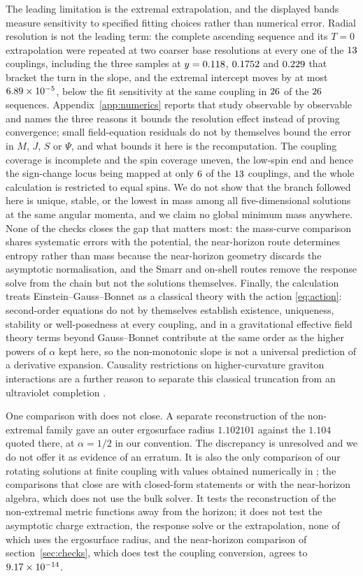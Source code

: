 \documentclass[11pt,a4paper]{article}
\begin{document}
The leading limitation is the extremal extrapolation, and the displayed bands
measure sensitivity to specified fitting choices rather than numerical error.
Radial resolution is not the leading term: the complete ascending sequence and
its $T=0$ extrapolation were repeated at two coarser base resolutions at every
one of the $13$ couplings, including the three samples at
$y=0.118$, $0.1752$ and $0.229$ that bracket the turn in the
slope, and the extremal intercept moves by at most $6.89\times 10^{-5}$, below the
fit sensitivity at the same coupling in $26$ of the $26$
sequences. Appendix~\ref{app:numerics} reports that study observable by
observable and names the three reasons it bounds the resolution effect instead
of proving convergence; small field-equation residuals do not by themselves
bound the error in $M$, $J$, $S$ or $\Psi$, and what bounds it here is the
recomputation. The coupling coverage is incomplete and the spin coverage
uneven, the low-spin end and hence the sign-change locus being mapped at only
$6$ of the $13$ couplings, and the whole calculation is
restricted to equal spins. We do not show that the branch followed here is
unique, stable, or the lowest in mass among all five-dimensional solutions at
the same angular momenta, and we claim no global minimum mass anywhere. None of
the checks closes the gap that matters most:
the mass-curve comparison shares systematic errors with the potential, the
near-horizon route determines entropy rather than mass because the near-horizon
geometry discards the asymptotic normalisation, and the Smarr and on-shell
routes remove the response solve from the chain but not the solutions
themselves. Finally, the calculation treats Einstein--Gauss--Bonnet as a
classical theory with the action \eqref{eq:action}: second-order equations do
not by themselves establish existence, uniqueness, stability or well-posedness
at every coupling, and in a gravitational effective field theory terms beyond
Gauss--Bonnet contribute at the same order as the higher powers of $\alpha$
kept here, so the non-monotonic slope is not a universal prediction of a
derivative expansion. Causality restrictions on higher-curvature graviton
interactions are a further reason to separate this classical truncation from an
ultraviolet completion \cite{Camanho:2014apa}.

One comparison with \cite{Brihaye:2010wp} does not close. A separate
reconstruction of the non-extremal family gave an outer ergosurface radius
$1.102101$ against the $1.104$ quoted there, at $\alpha=1/2$ in our
convention. The discrepancy is unresolved and we do not offer it as evidence
of an erratum. It is also the only comparison of our rotating solutions at
finite coupling with values obtained numerically in \cite{Brihaye:2010wp}; the
comparisons that close are with closed-form statements or with the
near-horizon algebra, which does not use the bulk solver. It tests the reconstruction of the non-extremal metric
functions away from the horizon; it does not test the asymptotic charge
extraction, the response solve or the extrapolation, none of which uses the
ergosurface radius, and the near-horizon comparison of section~\ref{sec:checks},
which does test the coupling conversion, agrees to $9.17\times 10^{-14}$.
\end{document}
